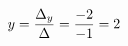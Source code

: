 \documentclass[preview]{standalone}
\begin{document}
\begin{align*}
\special{dvisvgm:raw <g id='unique000'>}y = \frac{\Delta_y}{\Delta} = \frac{-2}{-1} = 2\special{dvisvgm:raw </g>}
\end{align*}
\end{document}
